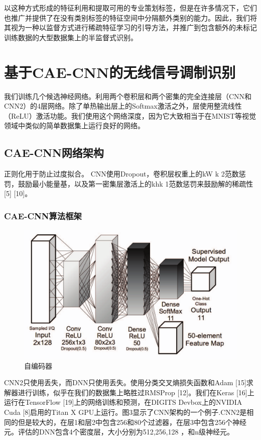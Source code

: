 以这种方式形成的特征利用和提取可用的专业策划标签，但是在许多情况下，它们也推广并提供了在没有类别标签的特征空间中分隔额外类别的能力。因此，我们将其视为一种以监督方式进行稀疏特征学习的引导方法，并推广到包含额外的未标记训练数据的大型数据集上的半监督式识别。\par


\section{基于CAE-CNN的无线信号调制识别}
我们训练几个候选神经网络。利用两个卷积层和两个密集的完全连接层（CNN和CNN2）的4层网络。除了单热输出层上的Softmax激活之外，层使用整流线性（ReLU）激活功能。我们使用这个网络深度，因为它大致相当于在MNIST等视觉领域中类似的简单数据集上运行良好的网络。\par 

\subsection{CAE-CNN网络架构}
正则化用于防止过度拟合。 CNN使用Dropout，卷积层权重上的kW k 2范数惩罚，鼓励最小能量基，以及第一密集层激活上的khk 1范数惩罚来鼓励解的稀疏性[5] [10]。 


\subsubsection{CAE-CNN算法框架}

\begin{figure}[!h]
	\centering
	\includegraphics[scale=0.3]{figures/chapter_3/cae_cnn_frame}
	\caption{自编码器}	\label{fig_3_2}
\end{figure}

CNN2只使用丢失，而DNN只使用丢失。使用分类交叉熵损失函数和Adam [15]求解器进行训练，似乎在我们的数据集上略胜过RMSProp [12]。我们在Keras [16]上运行在TensorFlow [19]上的网络训练和预测，在DIGITS Devbox上的NVIDIA Cuda [8]启用的Titan X GPU上运行。图3显示了CNN架构的一个例子.CNN2是相同的但是较大的，在层1和层2中包含256和80个过滤器，在层3中包含256个神经元。评估的DNN包含4个密度层，大小分别为512,256,128 ，和n级神经元。\par

